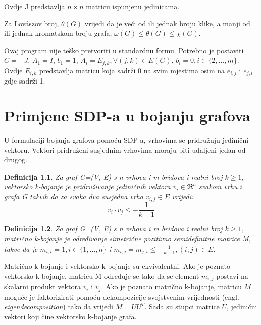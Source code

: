 \documentclass[diplomskirad]{fer}
\newtheorem{definicija}{Definicija}
\begin{document}
Ovdje J predstavlja $n \times n$ matricu ispunjenu jedinicama.


Za Lovászov broj, $ \theta(G) $ vrijedi da je veći od ili jednak broju klike, a manji od ili jednak kromatskom broju grafa, 
$\omega(G) \leq \theta(G) \leq \chi(G)$. \cite{1055985}

Ovaj program nije teško pretvoriti u standardnu formu. Potrebno je postaviti $C = -J$, $A_1 = I$, $b_1 = 1$,
$A_i = E_{j,k}, \forall (j,k) \in E(G)$, $b_i = 0, i \in \{2, \dots, m\}$. Ovdje $E_{i,k}$ predstavlja matricu koja sadrži 0 na
svim mjestima osim na $e_{i,j}$ i $e_{j, i}$ gdje sadrži 1.


\chapter{Primjene SDP-a u bojanju grafova}
\label{pog:primjene_SDP-a_u_bojanju_grafova}

U formulaciji bojanja grafova pomoću SDP-a, vrhovima se pridružuju jedinični vektoru. Vektori pridruženi susjednim vrhovima moraju
biti udaljeni jedan od drugog.

\begin{definicija}
  Za graf G=(V, E) s n vrhova i m bridova i realni broj $k \geq 1$, vektorsko k-bojanje je pridruživanje jediničnih
  vektora $v_i \in \Re^n$ svakom vrhu $i$ grafa G takvih da za svaka dva susjedna vrha $v_{i,j} \in E$ vrijedi:
  \begin{equation}
    v_i \cdot v_j \leq - \frac{1}{k-1}
  \end{equation}
\end{definicija} \cite{karger1998approximategraphcoloringsemidefinite}

\begin{definicija}
  Za graf G=(V, E) s n vrhova i m bridova i realni broj $k \geq 1$, matrično k-bojanje je određivanje simetrične pozitivno semidefinitne matrice M,
  takve da je $m_{i,i} = 1, i \in \{1, \dots, n\}$ i $m_{i,j} = m_{j,i} \leq - \frac{1}{k-1}, (i, j) \in E$.
\end{definicija}

Matrično k-bojanje i vektorsko k-bojanje su ekvivalentni. Ako je poznato vektorsko k-bojanje, matricu M određuje se tako da se
element $m_{i,j}$ postavi na skalarni produkt vektora $v_i$ i $v_j$. Ako je poznato matrično k-bojanje, matricu $M$ moguće je faktorizirati
pomoću dekompozicije svojstvenim vrijednosti (engl. \textit{eigendecomposition}) tako da vrijedi $M = UU^T$. Sada su stupci matrice $U$, jedinični
vektori koji čine vektorsko k-bojanje grafa. \cite{karger1998approximategraphcoloringsemidefinite}
\end{document}
